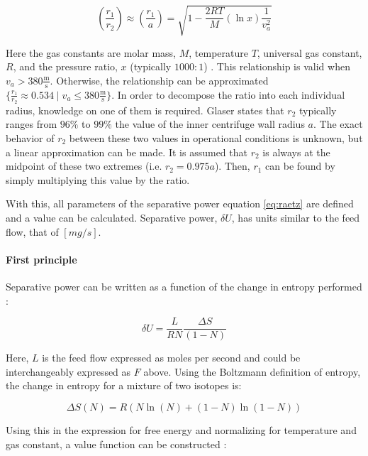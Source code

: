 \begin{equation}
    \left(\frac{r_1}{r_2}\right) \approx \left(\frac{r_1}{a}\right) = \sqrt{1 - \frac{2RT}{M}(\ln x)\frac{1}{v_{a}^{2}}}
\end{equation}
 
Here the gas constants are molar mass, $M$, temperature $T$, universal gas constant, $R$,
and the pressure ratio, $x$ (typically $1000:1$) \cite{}. %
This relationship is valid when $v_a > 380 \frac{\mathrm{m}}{\mathrm{s}}$.
Otherwise, the relationship can be approximated $\{\frac{r_1}{r_2} \approx 0.534 \mid v_a \leq 380 \frac{\mathrm{m}}{\mathrm{s}}\}$.
In order to decompose the ratio into each individual radius, knowledge on one
of them is required. Glaser \cite{glaser.2008} states that $r_2$ typically ranges
from $96\%$ to $99\%$ the value of the inner centrifuge wall radius $a$. The exact
behavior of $r_2$ between these two values in operational conditions is unknown,
but a linear approximation can be made. It is assumed that $r_2$ is always at
the midpoint of these two extremes (i.e. $r_2 = 0.975 a$). Then, $r_1$ can be
found by simply multiplying this value by the ratio.

With this, all parameters of the separative power equation \ref{eq:raetz} are
defined and a value can be calculated. Separative power, $\delta U$, has units similar to the feed flow, that of $[mg/s]$.

\paragraph{First principle}

Separative power can be written as a function of the change in entropy performed \cite{avery}:

\begin{equation}
    \delta U = \frac{L}{RN} \frac{\Delta S}{(1-N)}
\end{equation}

Here, $L$ is the feed flow expressed as moles per second and could be interchangeably expressed as $F$ above.
Using the Boltzmann definition of entropy, the change in entropy for a mixture of two isotopes is:

\begin{equation}
    \Delta S(N) = R \left( N \ln(N) + (1-N) \ln(1-N) \right)
\end{equation}

Using this in the expression for free energy \cite{?} and normalizing for temperature and gas constant,
a value function can be constructed \cite{?}:

